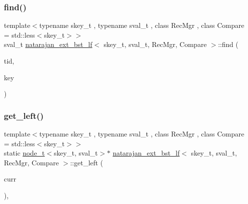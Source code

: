 \mbox{\label{classnatarajan__ext__bst__lf_aaca04e90b6cd390c3cf5701a08bcdb51}} 
\subsubsection{\texorpdfstring{find()}{find()}\hspace{0.1cm}{\footnotesize\ttfamily [2/2]}}
{\footnotesize\ttfamily template$<$typename skey\+\_\+t , typename sval\+\_\+t , class Rec\+Mgr , class Compare  = std\+::less$<$skey\+\_\+t$>$$>$ \\
sval\+\_\+t \hyperlink{classnatarajan__ext__bst__lf}{natarajan\+\_\+ext\+\_\+bst\+\_\+lf}$<$ skey\+\_\+t, sval\+\_\+t, Rec\+Mgr, Compare $>$\+::find (\begin{DoxyParamCaption}\item[{const int}]{tid,  }\item[{skey\+\_\+t}]{key }\end{DoxyParamCaption})\hspace{0.3cm}{\ttfamily [inline]}}

\mbox{\label{classnatarajan__ext__bst__lf_a51e5eea5239d5a12b5cbf99389affba4}} 
\subsubsection{\texorpdfstring{get\+\_\+left()}{get\_left()}\hspace{0.1cm}{\footnotesize\ttfamily [1/2]}}
{\footnotesize\ttfamily template$<$typename skey\+\_\+t , typename sval\+\_\+t , class Rec\+Mgr , class Compare  = std\+::less$<$skey\+\_\+t$>$$>$ \\
static \hyperlink{structnode__t}{node\+\_\+t}$<$skey\+\_\+t, sval\+\_\+t$>$$\ast$ \hyperlink{classnatarajan__ext__bst__lf}{natarajan\+\_\+ext\+\_\+bst\+\_\+lf}$<$ skey\+\_\+t, sval\+\_\+t, Rec\+Mgr, Compare $>$\+::get\+\_\+left (\begin{DoxyParamCaption}\item[{\hyperlink{structnode__t}{node\+\_\+t}$<$ skey\+\_\+t, sval\+\_\+t $>$ $\ast$}]{curr }\end{DoxyParamCaption})\hspace{0.3cm}{\ttfamily [inline]}, {\ttfamily [static]}}

